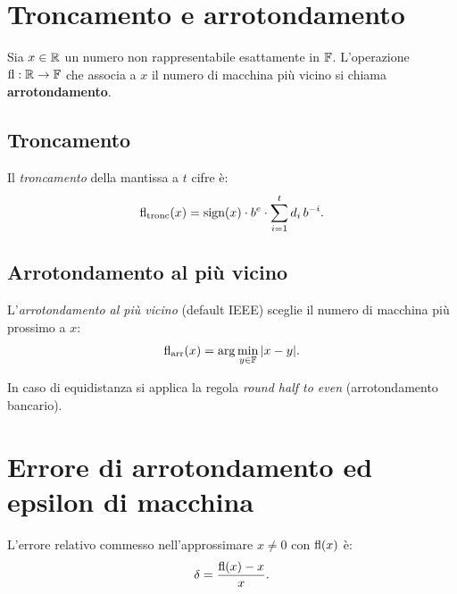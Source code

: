 \section{Troncamento e arrotondamento}

Sia $x \in \mathbb{R}$ un numero non rappresentabile esattamente in $\mathbb{F}$. L'operazione
$\operatorname{fl} : \mathbb{R} \to \mathbb{F}$ che associa a $x$ il numero di macchina più vicino si chiama
\textbf{arrotondamento}.

\subsection{Troncamento}

Il \emph{troncamento} della mantissa a $t$ cifre è:
\begin{equation}
  \operatorname{fl}_\text{tronc}(x) = \text{sign}(x) \cdot b^e \cdot \sum_{i=1}^{t} d_i\, b^{-i}.
\end{equation}

\subsection{Arrotondamento al più vicino}

L'\emph{arrotondamento al più vicino} (default IEEE) sceglie il numero di macchina più
prossimo a $x$:
\begin{equation}
  \operatorname{fl}_\text{arr}(x) = \arg\min_{y \in \mathbb{F}} |x - y|.
\end{equation}

In caso di equidistanza si applica la regola \emph{round half to even} (arrotondamento
bancario).

\section{Errore di arrotondamento ed epsilon di macchina}

\begin{definition}
L'errore relativo commesso nell'approssimare $x \neq 0$ con $\operatorname{fl}(x)$ è:
\begin{equation}
  \delta = \frac{\operatorname{fl}(x) - x}{x}.
  \label{eq:errore_rel}
\end{equation}
\end{definition}

